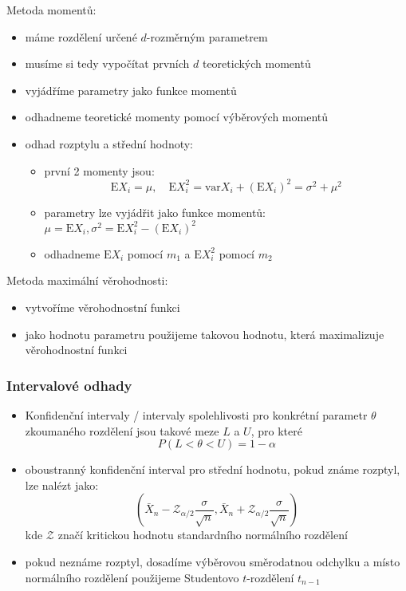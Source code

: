 Metoda momentů:
\begin{itemize}
	\item máme rozdělení určené $d$-rozměrným parametrem
	\item musíme si tedy vypočítat prvních $d$ teoretických momentů
	\item vyjádříme parametry jako funkce momentů
	\item odhadneme teoretické momenty pomocí výběrových momentů
	\item odhad rozptylu a střední hodnoty:
	\begin{itemize}
		\item první 2 momenty jsou: $$\text{E}X_i = \mu, \quad \text{E}X_i^2 = \text{var}X_i + (\text{E}X_i)^2 = \sigma^2 + \mu^2$$
		\item parametry lze vyjádřit jako funkce momentů: $\mu = \text{E}X_i, \sigma^2 = \text{E}X_i^2 - (\text{E}X_i)^2$
		\item odhadneme $\text{E}X_i$ pomocí $m_1$ a $\text{E}X_i^2$ pomocí $m_2$
	\end{itemize}
\end{itemize}
Metoda maximální věrohodnosti:
\begin{itemize}
	\item vytvoříme věrohodnostní funkci
	\item jako hodnotu parametru použijeme takovou hodnotu, která maximalizuje věrohodnostní funkci
\end{itemize}

\subsubsection*{Intervalové odhady}
\begin{itemize}
	\item Konfidenční intervaly / intervaly spolehlivosti pro konkrétní parametr $\theta$ zkoumaného rozdělení jsou takové meze $L$ a $U$, pro které $$P(L < \theta < U) = 1 - \alpha$$
	\item oboustranný konfidenční interval pro střední hodnotu, pokud známe rozptyl, lze nalézt jako: $$(\bar{X}_n - \mathcal{Z}_{\alpha / 2} \frac{\sigma}{\sqrt{n}}, \bar{X}_n + \mathcal{Z}_{\alpha / 2} \frac{\sigma}{\sqrt{n}})$$ 
kde $\mathcal{Z}$ značí kritickou hodnotu standardního normálního rozdělení
	\item pokud neznáme rozptyl, dosadíme výběrovou směrodatnou odchylku a místo normálního rozdělení po\-u\-ži\-je\-me Studentovo $t$-rozdělení $t_{n-1}$
\end{itemize}

